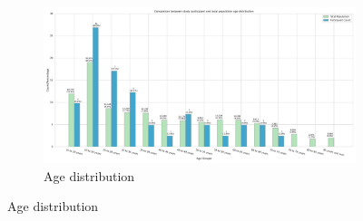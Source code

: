 \begin{figure}[ht]
    \centering
    \begin{subfigure}[b]{\textwidth}
        \centering
        \includegraphics[width=\textwidth]{content/image/demo/demo_age_group_vertical.pdf}
        \caption{Age distribution}
        \label{fig:demoAge}
    \end{subfigure}
    
    \vspace{0.5cm} %


\end{figure}
